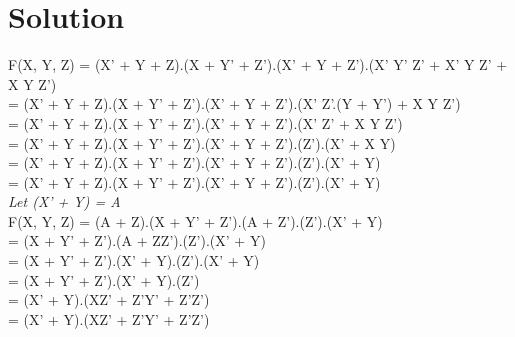\documentclass[journal,12pt]{IEEEtran}
\begin{document}
\section{Solution}
\vspace{10pt}
\begin{flushleft}
F(X, Y, Z) = (X' + Y + Z).(X + Y' + Z').(X' + Y + Z').(X' Y' Z' + X' Y Z' + X Y Z') \\
\vspace{1pt}
\hspace{52pt} = (X' + Y + Z).(X + Y' + Z').(X' + Y + Z').(X' Z'.(Y + Y') + X Y Z') \\
\vspace{1pt}
\hspace{52pt} = (X' + Y + Z).(X + Y' + Z').(X' + Y + Z').(X' Z' + X Y Z') \\
\vspace{1pt}
\hspace{52pt} = (X' + Y + Z).(X + Y' + Z').(X' + Y + Z').(Z').(X' + X Y) \\
\vspace{1pt}
\hspace{52pt} = (X' + Y + Z).(X + Y' + Z').(X' + Y + Z').(Z').(X' + Y) \\
\vspace{1pt}
\hspace{52pt} = (X' + Y + Z).(X + Y' + Z').(X' + Y + Z').(Z').(X' + Y) \\
\vspace{3pt}
\textit{Let (X' + Y) = A} \\
\vspace{3pt}
F(X, Y, Z) = (A + Z).(X + Y' + Z').(A + Z').(Z').(X' + Y) \\
\vspace{1pt}
\hspace{52pt} = (X + Y' + Z').(A + ZZ').(Z').(X' + Y) \\
\vspace{1pt}
\hspace{52pt} = (X + Y' + Z').(X' + Y).(Z').(X' + Y) \\
\vspace{1pt}
\hspace{52pt} = (X + Y' + Z').(X' + Y).(Z') \\
\vspace{1pt}
\hspace{52pt} = (X' + Y).(XZ' + Z'Y' + Z'Z') \\
\vspace{1pt}
\hspace{52pt} = (X' + Y).(XZ' + Z'Y' + Z'Z') \\

\end{flushleft}
\end{document}
